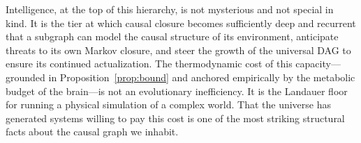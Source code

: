 \documentclass[11pt,a4paper]{article}
\theoremstyle{remark}
\begin{document}
Intelligence, at the top of this hierarchy, is not mysterious and not special
in kind. It is the tier at which causal closure becomes sufficiently deep and
recurrent that a subgraph can model the causal structure of its environment,
anticipate threats to its own Markov closure, and steer the growth of the
universal DAG to ensure its continued actualization. The thermodynamic cost of
this capacity---grounded in Proposition~\ref{prop:bound} and anchored empirically
by the metabolic budget of the brain---is not an evolutionary inefficiency. It is
the Landauer floor for running a physical simulation of a complex world. That the
universe has generated systems willing to pay this cost is one of the most
striking structural facts about the causal graph we inhabit.

\end{document}
